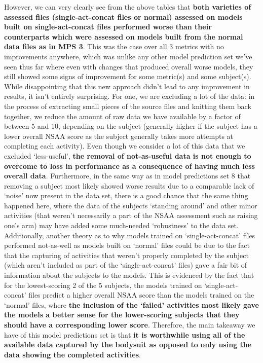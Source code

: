 \documentclass[12pt,twoside]{report}
\begin{document}
\quad However, we can very clearly see from the above tables that\textbf{ both varieties of assessed files (single-act-concat files or normal) assessed on models built on single-act-concat files performed worse than their counterparts which were assessed on models built from the normal data files as in MPS 3}. This was the case over all 3 metrics with no improvements anywhere, which was unlike any other model prediction set we’ve seen thus far where even with changes that produced overall worse models, they still showed some signs of improvement for some metric(s) and some subject(s). While disappointing that this new approach didn’t lead to any improvement in results, it isn’t entirely surprising. For one, we are excluding a lot of the data: in the process of extracting small pieces of the source files and knitting them back together, we reduce the amount of raw data we have available by a factor of between 5 and 10, depending on the subject (generally higher if the subject has a lower overall NSAA score as the subject generally takes more attempts at completing each activity). Even though we consider a lot of this data that we excluded ‘less-useful’, \textbf{the removal of not-as-useful data is not enough to overcome to loss in performance as a consequence of having much less overall data}. Furthermore, in the same way as in model predictions set 8 that removing a subject most likely showed worse results due to a comparable lack of ‘noise’ now present in the data set, there is a good chance that the same thing happened here, where the data of the subjects ‘standing around’ and other minor activities (that weren’t necessarily a part of the NSAA assessment such as raising one’s arm) may have added some much-needed ‘robustness’ to the data set.\\

\quad Additionally, another theory as to why models trained on ‘single-act-concat’ files performed not-as-well as models built on ‘normal’ files could be due to the fact that the capturing of activities that weren’t properly completed by the subject (which aren’t included as part of the ‘single-act-concat’ files) gave a fair bit of information about the subjects to the models. This is evidenced by the fact that for the lowest-scoring 2 of the 5 subjects, the models trained on ‘single-act-concat’ files predict a higher overall NSAA score than the models trained on the ‘normal’ files, where \textbf{the inclusion of the ‘failed’ activities most likely gave the models a better sense for the lower-scoring subjects that they should have a corresponding lower score}. Therefore, the main takeaway we have of this model predictions set is that \textbf{it is worthwhile using all of the available data captured by the bodysuit as opposed to only using the data showing the completed activities}.
\end{document}
